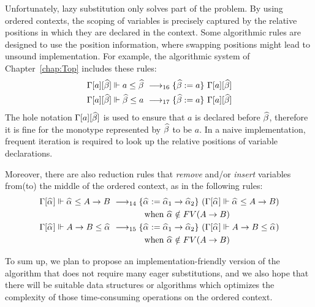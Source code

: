 Unfortunately, lazy substitution only solves part of the problem.
By using ordered contexts, the scoping of variables is precisely captured by
the relative positions in which they are declared in the context.
Some algorithmic rules are designed to use the position information,
where swapping positions might lead to unsound implementation.
For example, the algorithmic system of Chapter~\ref{chap:Top}
includes these rules:
\begin{gather*}
\begin{aligned}
    \Gm[a][\bt] \Vdash a \le \bt &\rrule{16} \{\bt := a\}~\Gm[a][\bt]\\
    \Gm[a][\bt] \Vdash \bt \le a &\rrule{17} \{\bt := a\}~\Gm[a][\bt]\\
\end{aligned}
\end{gather*}
The hole notation $\Gm[a][\bt]$ is used to ensure that $a$ is declared before $\bt$,
therefore it is fine for the monotype represented by $\bt$ to be $a$.
In a naive implementation, frequent iteration is required to look up the
relative positions of variable declarations.

Moreover, there are also reduction rules that \emph{remove}
and/or \emph{insert} variables from(to) the middle of the ordered context,
as in the following rules:
\begin{gather*}
\begin{aligned}
\Gm[\al] \Vdash \al \le A\to B &\rrule{14}
    \{\al := \al[1] \to \al[2]\}~(\Gm[\al] \Vdash \al \le A\to B)\\
    &\qquad\qquad \text{when } \al\notin FV(A \to B)\\
\Gm[\al] \Vdash A\to B \le \al &\rrule{15}
    \{\al := \al[1] \to \al[2]\}~(\Gm[\al] \Vdash A\to B \le \al)\\
    &\qquad\qquad \text{when } \al\notin  FV(A \to B)\\
\end{aligned}
\end{gather*}

To sum up,
we plan to propose an implementation-friendly version of the algorithm
that does not require many eager substitutions,
and we also hope that there will be suitable data structures or algorithms
which optimizes the complexity of those time-consuming operations on the ordered context.


